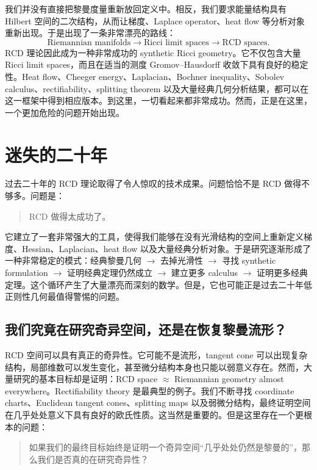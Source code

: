 \documentclass[lualatex]{article}
\begin{document}
我们并没有直接把黎曼度量重新放回定义中。相反，我们要求能量结构具有 Hilbert 空间的二次结构，从而让梯度、Laplace operator、heat flow 等分析对象重新出现。于是出现了一条非常漂亮的路线：
\[
    \text{Riemannian manifolds} \longrightarrow \text{Ricci limit spaces} \longrightarrow \text{RCD spaces}.
\]
RCD 理论因此成为一种非常成功的 synthetic Ricci geometry。它不仅包含大量 Ricci limit spaces，而且在适当的测度 Gromov--Hausdorff 收敛下具有良好的稳定性。Heat flow、Cheeger energy、Laplacian、Bochner inequality、Sobolev calculus、rectifiability、splitting theorem 以及大量经典几何分析结果，都可以在这一框架中得到相应版本。到这里，一切看起来都非常成功。然而，正是在这里，一个更加危险的问题开始出现。

\section{迷失的二十年}

过去二十年的 RCD 理论取得了令人惊叹的技术成果。问题恰恰不是 RCD 做得不够多。问题是：

\begin{quote}
RCD 做得太成功了。
\end{quote}

它建立了一套非常强大的工具，使得我们能够在没有光滑结构的空间上重新定义梯度、Hessian、Laplacian、heat flow 以及大量经典分析对象。于是研究逐渐形成了一种非常稳定的模式：经典黎曼几何 $\longrightarrow$ 去掉光滑性 $\longrightarrow$ 寻找 synthetic formulation $\longrightarrow$ 证明经典定理仍然成立 $\longrightarrow$ 建立更多 calculus $\longrightarrow$ 证明更多经典定理。这个循环产生了大量漂亮而深刻的数学。但是，它也可能正是过去二十年低正则性几何最值得警惕的问题。

\subsection{我们究竟在研究奇异空间，还是在恢复黎曼流形？}

RCD 空间可以具有真正的奇异性。它可能不是流形，tangent cone 可以出现复杂结构，局部维数可以发生变化，甚至微分结构本身也只能以弱意义存在。然而，大量研究的基本目标却是证明：RCD space $\approx$ Riemannian geometry almost everywhere。Rectifiability theory 是最典型的例子。我们不断寻找 coordinate charts、Euclidean tangent cones、splitting maps 以及弱微分结构，最终证明空间在几乎处处意义下具有良好的欧氏性质。这当然是重要的。但是这里存在一个更根本的问题：

\begin{quote}
如果我们的最终目标始终是证明一个奇异空间“几乎处处仍然是黎曼的”，那么我们是否真的在研究奇异性？
\end{quote}
\end{document}

